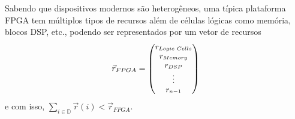          Sabendo que dispositivos modernos são heterogêneos, uma típica plataforma FPGA tem múltiplos tipos de recursos além de células lógicas como memória, blocos DSP, etc., podendo ser representados por um vetor de recursos
         \begin{equation} \small
            \vec{r}_{FPGA} =
            \begin{pmatrix}
            r_{Logic\ Cells} \\
            r_{Memory}\\
            r_{DSP}\\
            \vdots \\
            r_{n-1}
            \end{pmatrix}
         \end{equation}
         e com isso,
            $\sum_{i \in \mathbb{D}} \vec{r}(i) < \vec{r}_{FPGA}$.

